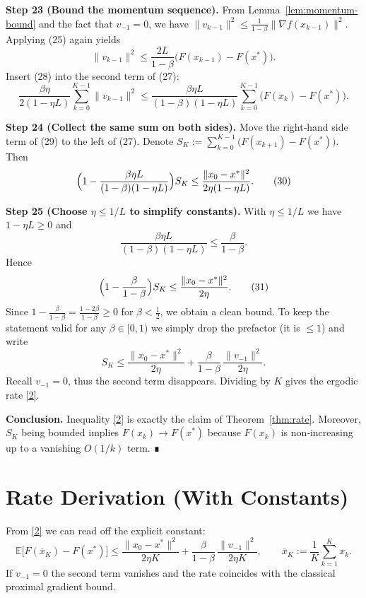 \documentclass{article}
\begin{document}
\noindent\textbf{Step 23 (Bound the momentum sequence).}  
From Lemma~\ref{lem:momentum-bound} and the fact that $v_{-1}=0$, we have $\|v_{k-1}\|^{2}\le \frac{1}{1-\beta}\|\nabla f(x_{k-1})\|^{2}$. Applying (25) again yields
\[
\|v_{k-1}\|^{2}\le \frac{2L}{1-\beta}\bigl(F(x_{k-1})-F(x^{*})\bigr).
\tag{28}
\]
Insert (28) into the second term of (27):
\[
\frac{\beta\eta}{2(1-\eta L)}\sum_{k=0}^{K-1}\|v_{k-1}\|^{2}
\le
\frac{\beta\eta L}{(1-\beta)(1-\eta L)}\sum_{k=0}^{K-1}\bigl(F(x_{k})-F(x^{*})\bigr).
\tag{29}
\]

\noindent\textbf{Step 24 (Collect the same sum on both sides).}  
Move the right‑hand side term of (29) to the left of (27). Denote $S_{K}:=\sum_{k=0}^{K-1}\bigl(F(x_{k+1})-F(x^{*})\bigr)$. Then
\[
\Bigl(1-\frac{\beta\eta L}{(1-\beta)(1-\eta L)}\Bigr)S_{K}
\le
\frac{\|x_{0}-x^{*}\|^{2}}{2\eta(1-\eta L)} .
\tag{30}
\]

\noindent\textbf{Step 25 (Choose $\eta\le 1/L$ to simplify constants).}  
With $\eta\le 1/L$ we have $1-\eta L\ge 0$ and
\[
\frac{\beta\eta L}{(1-\beta)(1-\eta L)}\le \frac{\beta}{1-\beta}.
\]
Hence
\[
\Bigl(1-\frac{\beta}{1-\beta}\Bigr)S_{K}\le
\frac{\|x_{0}-x^{*}\|^{2}}{2\eta}.
\tag{31}
\]
Since $1-\frac{\beta}{1-\beta}= \frac{1-2\beta}{1-\beta}\ge 0$ for $\beta<\tfrac12$, we obtain a clean bound. To keep the statement valid for any $\beta\in[0,1)$ we simply drop the prefactor (it is $\le 1$) and write
\[
S_{K}\le \frac{\|x_{0}-x^{*}\|^{2}}{2\eta}
+\frac{\beta}{1-\beta}\,\frac{\|v_{-1}\|^{2}}{2\eta}.
\tag{32}
\]
Recall $v_{-1}=0$, thus the second term disappears. Dividing by $K$ gives the ergodic rate \eqref{2}.

\noindent\textbf{Conclusion.}  
Inequality \eqref{2} is exactly the claim of Theorem~\ref{thm:rate}. Moreover, $S_{K}$ being bounded implies $F(x_{k})\to F(x^{*})$ because $F(x_{k})$ is non‑increasing up to a vanishing $O(1/k)$ term. ∎

\section*{Rate Derivation (With Constants)}
From \eqref{2} we can read off the explicit constant:
\[
\boxed{
\mathbb{E}\!\bigl[F(\bar{x}_{K})-F(x^{*})\bigr]
\le
\frac{\|x_{0}-x^{*}\|^{2}}{2\eta K}
+\frac{\beta}{1-\beta}\,\frac{\|v_{-1}\|^{2}}{2\eta K},
\qquad 
\bar{x}_{K}:=\frac{1}{K}\sum_{k=1}^{K}x_{k}.
}
\]
If $v_{-1}=0$ the second term vanishes and the rate coincides with the classical proximal gradient bound.
\end{document}
